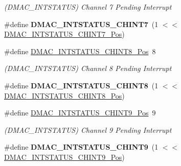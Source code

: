 \begin{DoxyCompactItemize}
\begin{DoxyCompactList}\small\item\em (D\+M\+A\+C\+\_\+\+I\+N\+T\+S\+T\+A\+T\+U\+S) Channel 7 Pending Interrupt \end{DoxyCompactList}\item 
\hypertarget{group___s_a_m_l21___d_m_a_c_gaed3efcf8c2e3840895748b436db627a6}{}\#define {\bfseries D\+M\+A\+C\+\_\+\+I\+N\+T\+S\+T\+A\+T\+U\+S\+\_\+\+C\+H\+I\+N\+T7}~(1 $<$$<$ \hyperlink{group___s_a_m_l21___d_m_a_c_ga434933267e89e51d56307c9a32334894}{D\+M\+A\+C\+\_\+\+I\+N\+T\+S\+T\+A\+T\+U\+S\+\_\+\+C\+H\+I\+N\+T7\+\_\+\+Pos})\label{group___s_a_m_l21___d_m_a_c_gaed3efcf8c2e3840895748b436db627a6}

\item 
\hypertarget{group___s_a_m_l21___d_m_a_c_gaf29c31af7c0c5823b9ffe1da68514f2a}{}\#define \hyperlink{group___s_a_m_l21___d_m_a_c_gaf29c31af7c0c5823b9ffe1da68514f2a}{D\+M\+A\+C\+\_\+\+I\+N\+T\+S\+T\+A\+T\+U\+S\+\_\+\+C\+H\+I\+N\+T8\+\_\+\+Pos}~8\label{group___s_a_m_l21___d_m_a_c_gaf29c31af7c0c5823b9ffe1da68514f2a}

\begin{DoxyCompactList}\small\item\em (D\+M\+A\+C\+\_\+\+I\+N\+T\+S\+T\+A\+T\+U\+S) Channel 8 Pending Interrupt \end{DoxyCompactList}\item 
\hypertarget{group___s_a_m_l21___d_m_a_c_gaf2d2bcbfd389b367cde0367f28645aa9}{}\#define {\bfseries D\+M\+A\+C\+\_\+\+I\+N\+T\+S\+T\+A\+T\+U\+S\+\_\+\+C\+H\+I\+N\+T8}~(1 $<$$<$ \hyperlink{group___s_a_m_l21___d_m_a_c_gaf29c31af7c0c5823b9ffe1da68514f2a}{D\+M\+A\+C\+\_\+\+I\+N\+T\+S\+T\+A\+T\+U\+S\+\_\+\+C\+H\+I\+N\+T8\+\_\+\+Pos})\label{group___s_a_m_l21___d_m_a_c_gaf2d2bcbfd389b367cde0367f28645aa9}

\item 
\hypertarget{group___s_a_m_l21___d_m_a_c_ga563cdad67b58e0d443f12f10c5dc3d29}{}\#define \hyperlink{group___s_a_m_l21___d_m_a_c_ga563cdad67b58e0d443f12f10c5dc3d29}{D\+M\+A\+C\+\_\+\+I\+N\+T\+S\+T\+A\+T\+U\+S\+\_\+\+C\+H\+I\+N\+T9\+\_\+\+Pos}~9\label{group___s_a_m_l21___d_m_a_c_ga563cdad67b58e0d443f12f10c5dc3d29}

\begin{DoxyCompactList}\small\item\em (D\+M\+A\+C\+\_\+\+I\+N\+T\+S\+T\+A\+T\+U\+S) Channel 9 Pending Interrupt \end{DoxyCompactList}\item 
\hypertarget{group___s_a_m_l21___d_m_a_c_gade5c3742327a2530ec8576d1b3eaae85}{}\#define {\bfseries D\+M\+A\+C\+\_\+\+I\+N\+T\+S\+T\+A\+T\+U\+S\+\_\+\+C\+H\+I\+N\+T9}~(1 $<$$<$ \hyperlink{group___s_a_m_l21___d_m_a_c_ga563cdad67b58e0d443f12f10c5dc3d29}{D\+M\+A\+C\+\_\+\+I\+N\+T\+S\+T\+A\+T\+U\+S\+\_\+\+C\+H\+I\+N\+T9\+\_\+\+Pos})\label{group___s_a_m_l21___d_m_a_c_gade5c3742327a2530ec8576d1b3eaae85}


\end{DoxyCompactItemize}
